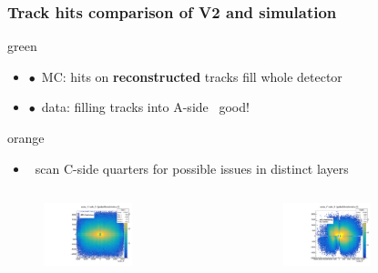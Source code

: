 \documentclass[aspectratio=1610, 12pt, xcolor=dvipsnames]{beamer}
\begin{document}
\begin{frame}\frametitle{Track hits comparison of V2 and simulation}
\begin{mybox}{green}{}
  \begin{itemize}
    \item $\bullet$\, MC: hits on \textbf{reconstructed} tracks fill whole detector
    \item $\bullet$\, data: filling tracks into A-side \to\, good!
  \end{itemize}
\end{mybox}
\begin{mybox}{orange}{}
  \begin{itemize}
    \item \to\, scan C-side quarters for possible issues in distinct layers
  \end{itemize}
\end{mybox}
  \begin{columns}
    \begin{column}[c]{0.48\textwidth}
      \begin{figure}
        \centering
        \includegraphics[width=0.6\textwidth]{logos/nodeXY_MC.pdf}%
      \end{figure}
    \end{column}
    \begin{column}[c]{0.48\textwidth}
      \begin{figure}
        \centering
        \includegraphics[width=0.6\textwidth]{tuples_out/combining_2D_nodeXY_v2.pdf}%
      \end{figure}
    \end{column}
  \end{columns}
\end{frame}
\end{document}

